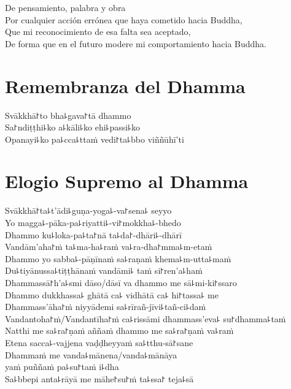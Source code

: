De pensamiento, palabra y obra\\
Por cualquier acción errónea que haya cometido hacia Buddha,\\
Que mi reconocimiento de esa falta sea aceptado,\\
De forma que en el futuro modere mi comportamiento hacia Buddha.

\clearpage

\chapter*{Remembranza del Dhamma}

\delegateSetUseNext

\begin{leader}
\end{leader}

Svākkhā꜓to bha꜕gava꜓tā dhammo\\
Sa꜓ndiṭṭhi꜕ko a꜕kāli꜕ko ehi꜕passi꜕ko\\
Opanayi꜕ko pa꜕cca꜕ttaṁ vedi꜓ta꜕bbo viññūhī'ti

\chapter*{Elogio Supremo al Dhamma}

\begin{leader}
\end{leader}

Svākkhā꜓ta꜕t'ādi꜕guṇa-yoga꜕-va꜓sena꜕ seyyo\\
Yo magga꜕-pāka-pa꜕riyatti꜕-vi꜓mokkha꜕-bhedo\\
Dhammo ku꜕loka-pa꜕ta꜓nā ta꜕da꜓-dhāri꜕-dhārī\\
Vandām'aha꜓ṁ ta꜕ma-ha꜕raṁ va꜕ra-dha꜓mma꜕m-etaṁ\\
Dhammo yo sabba꜕-pāṇīnaṁ sa꜕raṇaṁ khema꜕m-utta꜕maṁ\\
Du꜕tiyānussa꜕tiṭṭhānaṁ vandāmi꜕ taṁ si꜓ren'a꜕haṁ\\
Dhammassā꜓h'a꜕smi dāso/dāsī va dhammo me sā꜕mi-ki꜓ssaro\\
Dhammo dukkhassa꜕ ghātā ca꜕ vidhātā ca꜕ hi꜓tassa꜕ me\\
Dhammass'āha꜓ṁ niyyādemi sa꜕rīrañ-jīvi꜕tañ-ci꜕daṁ\\
Vandantoha꜓ṁ/Vandantīha꜓ṁ ca꜕rissāmi dhammass'eva꜕ su꜓dhamma꜕taṁ\\
Natthi me sa꜕ra꜓ṇaṁ aññaṁ dhammo me sa꜕ra꜓ṇaṁ va꜕raṁ\\
Etena sacca꜕-vajjena vaḍḍheyyaṁ sa꜕tthu-sā꜓sane\\
Dhammaṁ me vanda꜕mānena/vanda꜕mānāya\\
\vin yaṁ puññaṁ pa꜕su꜓taṁ i꜕dha\\
Sa꜕bbepi anta꜕rāyā me māhe꜓su꜓ṁ ta꜕ssa꜓ teja꜕sā

